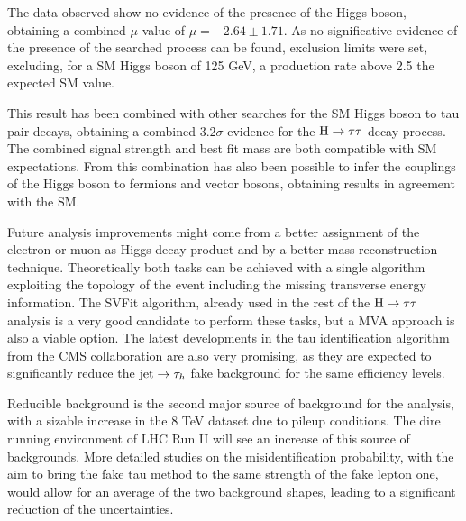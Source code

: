 The data observed show no evidence of the presence of the Higgs boson, obtaining a combined $\mu$ value of $\mu = -2.64 \pm 1.71$. As no significative evidence of the presence of the searched process can be found, exclusion limits were set, excluding, for a SM Higgs boson of 125 GeV, a production rate above 2.5 the expected SM value.

This result has been combined with other searches for the SM Higgs boson to tau pair decays, obtaining a combined $3.2\sigma$ evidence for the $\mathrm{H} \rightarrow \tau \tau$ decay process. The combined signal strength and best fit mass are both compatible with SM expectations. From this combination has also been possible to infer the couplings of the Higgs boson to fermions and vector bosons, obtaining results in agreement with the SM.

%

Future analysis improvements might come from a better assignment of the electron or muon as Higgs decay product and by a better mass reconstruction technique. Theoretically both tasks can be achieved with a single algorithm exploiting the topology of the event including the missing transverse energy information. The SVFit algorithm, already used in the rest of the $\mathrm{H} \rightarrow \tau\tau$ analysis is a very good candidate to perform these tasks, but a MVA approach is also a viable option. The latest developments in the tau identification algorithm from the CMS collaboration are also very promising, as they are expected to significantly reduce the $\mathrm{jet} \rightarrow \tau_h$ fake background for the same efficiency levels.

Reducible background is the second major source of background for the analysis, with a sizable increase in the 8 TeV dataset due to pileup conditions. The dire running environment of LHC Run II will see an increase of this source of backgrounds. More detailed studies on the misidentification probability, with the aim to bring the fake tau method to the same strength of the fake lepton one, would allow for an average of the two background shapes, leading to a significant reduction of the uncertainties.
